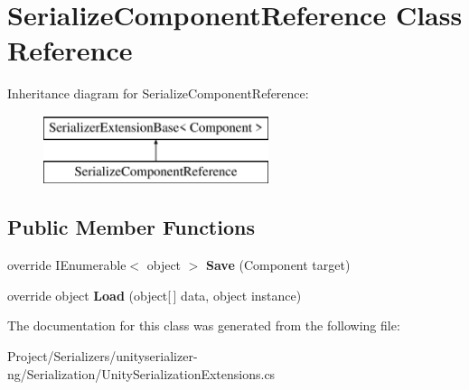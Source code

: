 \hypertarget{class_serialize_component_reference}{}\section{Serialize\+Component\+Reference Class Reference}
\label{class_serialize_component_reference}
Inheritance diagram for Serialize\+Component\+Reference\+:\begin{figure}[H]
\begin{center}
\leavevmode
\includegraphics[height=2.000000cm]{class_serialize_component_reference}
\end{center}
\end{figure}
\subsection*{Public Member Functions}
\begin{DoxyCompactItemize}
\item 
\mbox{\label{class_serialize_component_reference_af5ca5949f4c6d435bf8af4bb3718982c}} 
override I\+Enumerable$<$ object $>$ {\bfseries Save} (Component target)
\item 
\mbox{\label{class_serialize_component_reference_aee8108ae073c2c74d95244f2bd10cc8c}} 
override object {\bfseries Load} (object\mbox{[}$\,$\mbox{]} data, object instance)
\end{DoxyCompactItemize}


The documentation for this class was generated from the following file\+:\begin{DoxyCompactItemize}
\item 
Project/\+Serializers/unityserializer-\/ng/\+Serialization/Unity\+Serialization\+Extensions.\+cs\end{DoxyCompactItemize}
